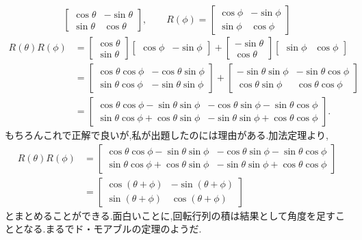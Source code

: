 \begin{enumerate}[label=(\arabic*)]
\[\begin{bmatrix}
        \cos\theta & -\sin\theta \\ \sin\theta & \cos\theta
    \end{bmatrix},\qquad R(\phi)=\begin{bmatrix}
        \cos\phi & -\sin\phi \\ \sin\phi & \cos\phi
    \end{bmatrix}\]
    \begin{align*}
        R(\theta)R(\phi) &=
        \begin{bmatrix}\cos\theta \\ \sin\theta \end{bmatrix}
        \begin{bmatrix} \cos\phi & -\sin\phi \end{bmatrix} + 
        \begin{bmatrix}-\sin\theta \\ \cos\theta \end{bmatrix}
        \begin{bmatrix} \sin\phi & \cos\phi \end{bmatrix}\\
        & = 
        \begin{bmatrix}
            \cos\theta\cos\phi & -\cos\theta\sin\phi \\ \sin\theta\cos\phi & -\sin\theta\sin\phi
        \end{bmatrix}+
        \begin{bmatrix}
            -\sin\theta\sin\phi & -\sin\theta\cos\phi \\ \cos\theta\sin\phi & \cos\theta\cos\phi
        \end{bmatrix}\\
        & =
        \begin{bmatrix}
            \cos\theta\cos\phi -\sin\theta\sin\phi & -\cos\theta\sin\phi -\sin\theta\cos\phi \\ \sin\theta\cos\phi + \cos\theta\sin\phi & -\sin\theta\sin\phi + \cos\theta\cos\phi
        \end{bmatrix}.
    \end{align*}
    もちろんこれで正解で良いが,私が出題したのには理由がある.加法定理より,
    \begin{align*}
        R(\theta)R(\phi) &=
        \begin{bmatrix}
            \cos\theta\cos\phi -\sin\theta\sin\phi & -\cos\theta\sin\phi -\sin\theta\cos\phi \\ \sin\theta\cos\phi + \cos\theta\sin\phi & -\sin\theta\sin\phi + \cos\theta\cos\phi
        \end{bmatrix}\\
        &=
        \begin{bmatrix}
            \cos(\theta+\phi) & -\sin(\theta+\phi) \\ \sin(\theta+\phi) & \cos(\theta+\phi)
        \end{bmatrix} 
    \end{align*}
    とまとめることができる.面白いことに,回転行列の積は結果として角度を足すこととなる.まるでド・モアブルの定理のようだ.
\end{enumerate}

